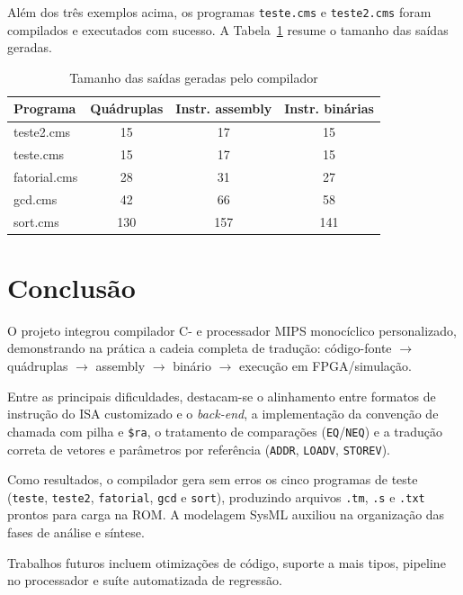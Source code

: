 \documentclass[
	12pt,				%
	openright,			%
	a4paper,			%
	english,			%
	french,				%
	spanish,			%
	brazil,				%
	]{abntex2}
\begin{document}
Além dos três exemplos acima, os programas \texttt{teste.cms} e \texttt{teste2.cms} foram compilados e executados com sucesso. A Tabela~\ref{tab:validacao} resume o tamanho das saídas geradas.

\begin{table}[H]
\centering
\caption{Tamanho das saídas geradas pelo compilador}
\label{tab:validacao}
\begin{tabular}{|l|c|c|c|}
\hline
\textbf{Programa} & \textbf{Quádruplas} & \textbf{Instr. assembly} & \textbf{Instr. binárias} \\
\hline
teste2.cms & 15 & 17 & 15 \\
teste.cms & 15 & 17 & 15 \\
fatorial.cms & 28 & 31 & 27 \\
gcd.cms & 42 & 66 & 58 \\
sort.cms & 130 & 157 & 141 \\
\hline
\end{tabular}
\end{table}



\chapter{Conclusão}

O projeto integrou compilador C- e processador MIPS monocíclico personalizado, demonstrando na prática a cadeia completa de tradução: código-fonte $\rightarrow$ quádruplas $\rightarrow$ assembly $\rightarrow$ binário $\rightarrow$ execução em FPGA/simulação.

Entre as principais dificuldades, destacam-se o alinhamento entre formatos de instrução do ISA customizado e o \emph{back-end}, a implementação da convenção de chamada com pilha e \texttt{\$ra}, o tratamento de comparações (\texttt{EQ}/\texttt{NEQ}) e a tradução correta de vetores e parâmetros por referência (\texttt{ADDR}, \texttt{LOADV}, \texttt{STOREV}).

Como resultados, o compilador gera sem erros os cinco programas de teste (\texttt{teste}, \texttt{teste2}, \texttt{fatorial}, \texttt{gcd} e \texttt{sort}), produzindo arquivos \texttt{.tm}, \texttt{.s} e \texttt{.txt} prontos para carga na ROM. A modelagem SysML auxiliou na organização das fases de análise e síntese.

Trabalhos futuros incluem otimizações de código, suporte a mais tipos, pipeline no processador e suíte automatizada de regressão.

\end{document}
